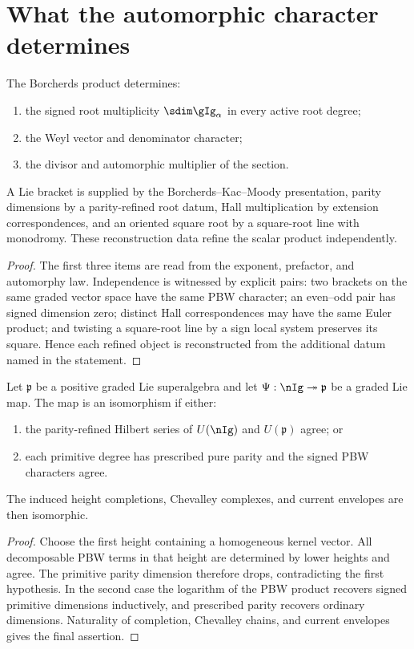 \chapter{What the automorphic character determines}
\begin{theorem}
The Borcherds product determines:
\begin{enumerate}
\item the signed root multiplicity $\sdim\gIg_\alpha$ in every active root degree;
\item the Weyl vector and denominator character;
\item the divisor and automorphic multiplier of the section.
\end{enumerate}
A Lie bracket is supplied by the Borcherds--Kac--Moody presentation, parity dimensions by a parity-refined root datum, Hall multiplication by extension correspondences, and an oriented square root by a square-root line with monodromy.  These reconstruction data refine the scalar product independently.
\end{theorem}
\begin{proof}
The first three items are read from the exponent, prefactor, and automorphy law.  Independence is witnessed by explicit pairs: two brackets on the same graded vector space have the same PBW character; an even--odd pair has signed dimension zero; distinct Hall correspondences may have the same Euler product; and twisting a square-root line by a sign local system preserves its square.  Hence each refined object is reconstructed from the additional datum named in the statement.
\end{proof}

\begin{recognition}
Let $\mathfrak p$ be a positive graded Lie superalgebra and let $\Psi:\nIg\twoheadrightarrow\mathfrak p$ be a graded Lie map.  The map is an isomorphism if either:
\begin{enumerate}
\item the parity-refined Hilbert series of $U(\nIg)$ and $U(\mathfrak p)$ agree; or
\item each primitive degree has prescribed pure parity and the signed PBW characters agree.
\end{enumerate}
The induced height completions, Chevalley complexes, and current envelopes are then isomorphic.
\end{recognition}
\begin{proof}
Choose the first height containing a homogeneous kernel vector.  All decomposable PBW terms in that height are determined by lower heights and agree.  The primitive parity dimension therefore drops, contradicting the first hypothesis.  In the second case the logarithm of the PBW product recovers signed primitive dimensions inductively, and prescribed parity recovers ordinary dimensions.  Naturality of completion, Chevalley chains, and current envelopes gives the final assertion.
\end{proof}


